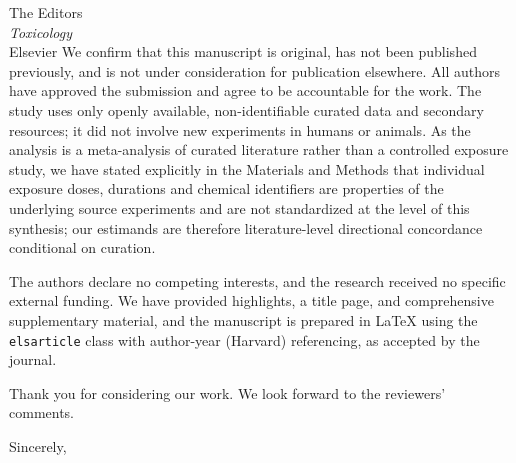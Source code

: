 \documentclass[11pt]{letter}
\begin{document}
\begin{letter}{The Editors \\ \textit{Toxicology} \\ Elsevier}
We confirm that this manuscript is original, has not been published previously,
and is not under consideration for publication elsewhere. All authors have
approved the submission and agree to be accountable for the work. The study uses
only openly available, non-identifiable curated data and secondary resources; it
did not involve new experiments in humans or animals. As the analysis is a
meta-analysis of curated literature rather than a controlled exposure study, we
have stated explicitly in the Materials and Methods that individual exposure
doses, durations and chemical identifiers are properties of the underlying source
experiments and are not standardized at the level of this synthesis; our
estimands are therefore literature-level directional concordance conditional on
curation.

The authors declare no competing interests, and the research received no specific
external funding. We have provided highlights, a title page, and comprehensive
supplementary material, and the manuscript is prepared in \LaTeX{} using the
\texttt{elsarticle} class with author-year (Harvard) referencing, as accepted by
the journal.

Thank you for considering our work. We look forward to the reviewers' comments.

\closing{Sincerely,}

\end{letter}
\end{document}
